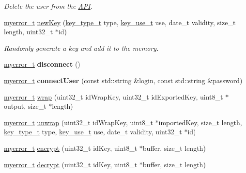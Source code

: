 \begin{DoxyCompactItemize}
\begin{DoxyCompactList}\small\item\em Delete the user from the \hyperlink{classAPI}{A\+P\+I}. \end{DoxyCompactList}\item 
\hyperlink{error_8hpp_acabd2917084445509becf54ab64a4bd0}{myerror\+\_\+t} \hyperlink{classAPI_a94ef4273680b86b5340442d965b48fab}{new\+Key} (\hyperlink{key_8hpp_a4f367c350737c92475175fb229c5570e}{key\+\_\+type\+\_\+t} type, \hyperlink{key_8hpp_a82f88f5cef6b287c45bd2fbb36879c3e}{key\+\_\+use\+\_\+t} use, date\+\_\+t validity, size\+\_\+t length, uint32\+\_\+t $\ast$id)
\begin{DoxyCompactList}\small\item\em Randomly generate a key and add it to the memory. \end{DoxyCompactList}\item 
\hypertarget{classAPI_a2ad579d9450aa11e1fe5694283dc157e}{}\hyperlink{error_8hpp_acabd2917084445509becf54ab64a4bd0}{myerror\+\_\+t} {\bfseries disconnect} ()\label{classAPI_a2ad579d9450aa11e1fe5694283dc157e}

\item 
\hypertarget{classAPI_a72faff24818ed8340f226ea07d437c3f}{}\hyperlink{error_8hpp_acabd2917084445509becf54ab64a4bd0}{myerror\+\_\+t} {\bfseries connect\+User} (const std\+::string \&login, const std\+::string \&password)\label{classAPI_a72faff24818ed8340f226ea07d437c3f}

\item 
\hyperlink{error_8hpp_acabd2917084445509becf54ab64a4bd0}{myerror\+\_\+t} \hyperlink{classAPI_ac115603da5cc49b407f6b3710e01a985}{wrap} (uint32\+\_\+t id\+Wrap\+Key, uint32\+\_\+t id\+Exported\+Key, uint8\+\_\+t $\ast$output, size\+\_\+t $\ast$length)
\item 
\hyperlink{error_8hpp_acabd2917084445509becf54ab64a4bd0}{myerror\+\_\+t} \hyperlink{classAPI_ad232f21ac35cb1d60aaef0b6e7979c15}{unwrap} (uint32\+\_\+t id\+Wrap\+Key, uint8\+\_\+t $\ast$imported\+Key, size\+\_\+t length, \hyperlink{key_8hpp_a4f367c350737c92475175fb229c5570e}{key\+\_\+type\+\_\+t} type, \hyperlink{key_8hpp_a82f88f5cef6b287c45bd2fbb36879c3e}{key\+\_\+use\+\_\+t} use, date\+\_\+t validity, uint32\+\_\+t $\ast$id)
\item 
\hyperlink{error_8hpp_acabd2917084445509becf54ab64a4bd0}{myerror\+\_\+t} \hyperlink{classAPI_a4253afc0859f3af205a305c5d8201ed3}{encrypt} (uint32\+\_\+t id\+Key, uint8\+\_\+t $\ast$buffer, size\+\_\+t length)
\item 
\hyperlink{error_8hpp_acabd2917084445509becf54ab64a4bd0}{myerror\+\_\+t} \hyperlink{classAPI_ac017bb211709f56b2584e1ad6f8c6b12}{decrypt} (uint32\+\_\+t id\+Key, uint8\+\_\+t $\ast$buffer, size\+\_\+t length)
\end{DoxyCompactItemize}
